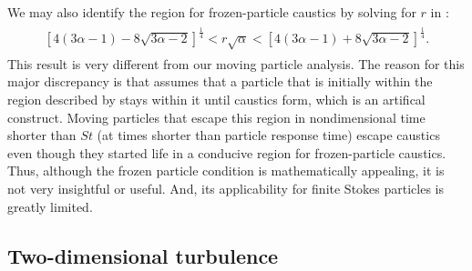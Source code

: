   We may also identify the region for frozen-particle caustics by solving for $r$ in :
  \begin{align}
  \label{caustics-sol}
  \begin{split}
    \left[ 4 (3 \alpha -1) - 8 \sqrt{3 \alpha -2}\right]^{\frac{1}{4}} < r\sqrt{\alpha} < \left[ 4 (3 \alpha -1) + 8 \sqrt{3 \alpha -2}\right]^{\frac{1}{4}}.
  \end{split}
  \end{align}
  This result is very different from our moving particle analysis. The reason for this major discrepancy is that  assumes that a particle that is initially within the region described by  stays within it until caustics form, {which is an artifical construct}. Moving particles that escape this region in {nondimensional} time shorter than $St$ ({at times shorter than particle response time}) escape caustics even though they started life in a conducive region for frozen-particle caustics. {Thus, although the frozen particle condition is mathematically appealing, it is not very insightful or useful. And, its applicability for finite Stokes particles is greatly limited.}
  
\subsection{Two-dimensional turbulence}\label{turb}

